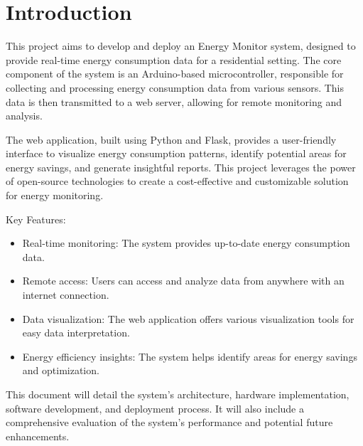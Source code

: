 \section{Introduction}

This project aims to develop and deploy an Energy Monitor system, designed to provide real-time energy consumption data for a residential setting. The core component of the system is an Arduino-based microcontroller, responsible for collecting and processing energy consumption data from various sensors. This data is then transmitted to a web server, allowing for remote monitoring and analysis. 

The web application, built using Python and Flask, provides a user-friendly interface to visualize energy consumption patterns, identify potential areas for energy savings, and generate insightful reports. This project leverages the power of open-source technologies to create a cost-effective and customizable solution for energy monitoring.

Key Features:
\begin{itemize}
    \item Real-time monitoring: The system provides up-to-date energy consumption data.
    \item Remote access: Users can access and analyze data from anywhere with an internet connection.
    \item Data visualization: The web application offers various visualization tools for easy data interpretation.
    \item Energy efficiency insights: The system helps identify areas for energy savings and optimization.
\end{itemize}

This document will detail the system's architecture, hardware implementation, software development, and deployment process. It will also include a comprehensive evaluation of the system's performance and potential future enhancements.